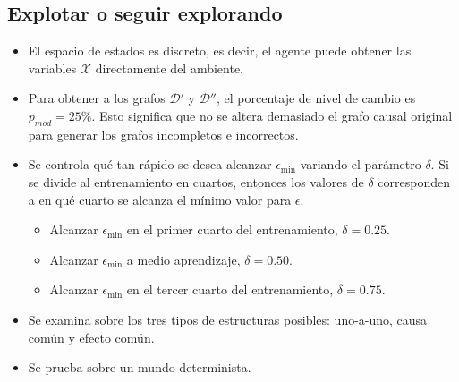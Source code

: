


\newpage

\subsection{Explotar o seguir explorando}\label{subsection:exp-epsilon}


\begin{itemize}
    \item El espacio de estados es discreto, es decir, el agente puede
    obtener las variables $\mathcal{X}$ directamente del ambiente.
    \item Para obtener a los
    grafos $\mathcal{D'}$ y $\mathcal{D''}$,
    el porcentaje de nivel de cambio  es $p_{mod} = 25 \%$. Esto significa que no se altera demasiado el grafo causal original para
    generar los grafos incompletos e incorrectos.
    \item Se controla qué tan rápido se desea alcanzar $\epsilon_{\min}$ variando el parámetro $\delta$. Si se divide al entrenamiento en cuartos,  entonces los valores de $\delta$ corresponden a en qué cuarto se alcanza el mínimo valor para $\epsilon$.
    \begin{itemize}
        \item Alcanzar $\epsilon_{\min}$ en el primer cuarto del entrenamiento, $\delta = 0.25$.
        \item Alcanzar $\epsilon_{\min}$ a medio aprendizaje, $\delta = 0.50$.
        \item Alcanzar $\epsilon_{\min}$ en el tercer cuarto del entrenamiento, $\delta = 0.75$.
    \end{itemize}
    \item Se examina sobre los tres tipos de estructuras posibles: uno-a-uno, 
    causa común y efecto común. 
    \item Se prueba sobre un mundo determinista.
\end{itemize}

